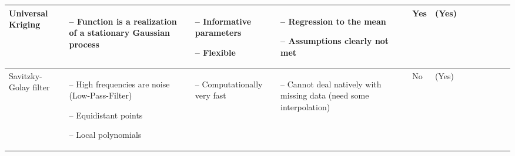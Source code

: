 \begin{table}[!ht]
\begin{tabular}{p{1.6cm}p{3.3cm}p{3.3cm}p{3.4cm}p{0.4cm}p{0.4cm}p{3cm}p{3cm}p{3cm}p{3cm}p{2.7cm}p{3cm}|}
		Universal Kriging                                                                                                                                            &
		\begin{cptitemize} \item[--]  Function is a realization of a stationary Gaussian process                                      \end{cptitemize}               &
		\begin{cptitemize} \item[--]  Informative parameters \item[--]  Flexible                                                             \end{cptitemize}        &
		\begin{cptitemize} \item[--]  Regression to the mean \item[--]  Assumptions clearly not met                                          \end{cptitemize}        &
		Yes                                                                                                                                                          &
		(Yes)                \\ \hline%

		Savitzky-Golay filter                                                                                                                                        &
		\begin{cptitemize}
			\item[--]  High frequencies are noise (Low-Pass-Filter) \item[--]  Equidistant points \item[--]  Local polynomials\end{cptitemize}                                              &
		\begin{cptitemize} \item[--]  Computationally very fast                                                                   \end{cptitemize}                   &
		\begin{cptitemize} \item[--]  Cannot deal natively with missing data (need some interpolation)                              \end{cptitemize}                 &
		No                                                                                                                                                           &
		(Yes)                                                                                                                                                         \\ \hline%


\end{tabular}
\end{table}
